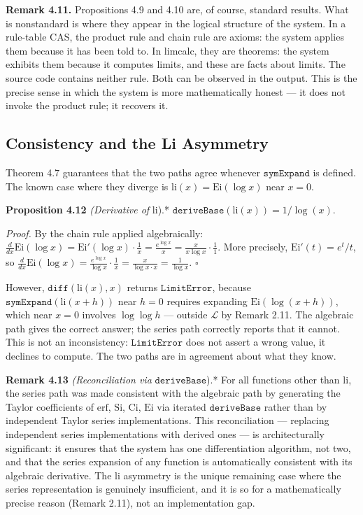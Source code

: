 \documentclass[12pt]{article}
\begin{document}
\textbf{Remark 4.11.} Propositions 4.9 and 4.10 are, of course, standard
results. What is nonstandard is where they appear in the logical
structure of the system. In a rule-table CAS, the product rule and chain
rule are axioms: the system applies them because it has been told to. In
limcalc, they are theorems: the system exhibits them because it computes
limits, and these are facts about limits. The source code contains
neither rule. Both can be observed in the output. This is the precise
sense in which the system is more mathematically honest --- it does not
invoke the product rule; it recovers it.




\subsection{Consistency and the Li
Asymmetry}\label{consistency-and-the-li-asymmetry}

Theorem 4.7 guarantees that the two paths agree whenever
\(\mathtt{symExpand}\) is defined. The known case where they diverge is
\(\mathrm{li}(x) = \mathrm{Ei}(\log x)\) near \(x = 0\).

\textbf{Proposition 4.12} \emph{(Derivative of} \(\mathrm{li}\)).*
\(\mathtt{deriveBase}(\mathrm{li}(x)) = 1/\log(x)\).

\emph{Proof.} By the chain rule applied algebraically:
\(\frac{d}{dx}\mathrm{Ei}(\log x) = \mathrm{Ei}'(\log x) \cdot \frac{1}{x} = \frac{e^{\log x}}{x} = \frac{x}{x \log x} \cdot \frac{1}{1}\).
More precisely, \(\mathrm{Ei}'(t) = e^t/t\), so
\(\frac{d}{dx}\mathrm{Ei}(\log x) = \frac{e^{\log x}}{\log x} \cdot \frac{1}{x} = \frac{x}{\log x \cdot x} = \frac{1}{\log x}\).
\(\square\)

However, \(\mathtt{diff}(\mathrm{li}(x), x)\) returns
\(\mathtt{LimitError}\), because
\(\mathtt{symExpand}(\mathrm{li}(x+h))\) near \(h = 0\) requires
expanding \(\mathrm{Ei}(\log(x+h))\), which near \(x = 0\) involves
\(\log \log h\) --- outside \(\mathcal{L}\) by Remark 2.11. The
algebraic path gives the correct answer; the series path correctly
reports that it cannot. This is not an inconsistency:
\(\mathtt{LimitError}\) does not assert a wrong value, it declines to
compute. The two paths are in agreement about what they know.

\textbf{Remark 4.13} \emph{(Reconciliation via}
\(\mathtt{deriveBase}\)).* For all functions other than \(\mathrm{li}\),
the series path was made consistent with the algebraic path by
generating the Taylor coefficients of \(\mathrm{erf}\), \(\mathrm{Si}\),
\(\mathrm{Ci}\), \(\mathrm{Ei}\) via iterated \(\mathtt{deriveBase}\)
rather than by independent Taylor series implementations. This
reconciliation --- replacing independent series implementations with
derived ones --- is architecturally significant: it ensures that the
system has one differentiation algorithm, not two, and that the series
expansion of any function is automatically consistent with its algebraic
derivative. The \(\mathrm{li}\) asymmetry is the unique remaining case
where the series representation is genuinely insufficient, and it is so
for a mathematically precise reason (Remark 2.11), not an implementation
gap.
\end{document}
